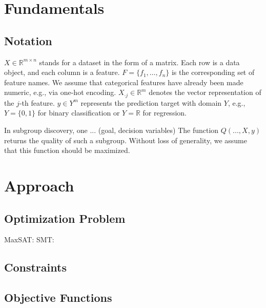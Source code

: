 \documentclass{article}
\theoremstyle{definition}
\begin{document}
\section{Fundamentals}
\label{sec:osd:fundamentals}

\subsection{Notation}
\label{sec:osd:fundamentals:notation}

$X \in \mathbb{R}^{m \times n}$ stands for a dataset in the form of a matrix.
Each row is a data object, and each column is a feature.
$F = \{f_1, \dots, f_n\}$ is the corresponding set of feature names.
We assume that categorical features have already been made numeric, e.g., via one-hot encoding.
$X_{\cdot{}j} \in \mathbb{R}^m$ denotes the vector representation of the $j$-th feature.
$y \in Y^m$ represents the prediction target with domain $Y$, e.g., $Y=\{0,1\}$ for binary classification or $Y=\mathbb{R}$ for regression.

In subgroup discovery, one ... (goal, decision variables)
The function $Q(...,X,y)$ returns the quality of such a subgroup.
Without loss of generality, we assume that this function should be maximized.

\section{Approach}
\label{sec:osd:approach}

\subsection{Optimization Problem}
\label{sec:osd:approach:problem}

MaxSAT: \cite{li2021maxsat} \cite{bacchus2021maximum}
SMT: \cite{barrett2018satisfiability}

\subsection{Constraints}
\label{sec:osd:approach:constraints}

\cite{mosek2022modeling}
\cite{sinz2005towards}
\cite{ulrich2022selecting}

\subsection{Objective Functions}
\label{sec:osd:approach:objectives}
\end{document}
